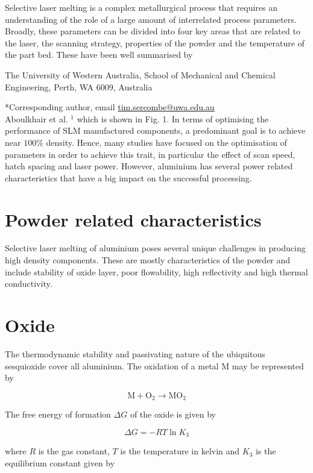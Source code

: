 \documentclass[10pt]{article}
\begin{document}
Selective laser melting is a complex metallurgical process that requires an understanding of the role of a large amount of interrelated process parameters. Broadly, these parameters can be divided into four key areas that are related to the laser, the scanning strategy, properties of the powder and the temperature of the part bed. These have been well summarised by

The University of Western Australia, School of Mechanical and Chemical Engineering, Perth, WA 6009, Australia

*Corresponding author, email \href{mailto:tim.sercombe@uwa.edu.au}{tim.sercombe@uwa.edu.au}\\
Aboulkhair et al. ${ }^{1}$ which is shown in Fig. 1. In terms of optimising the performance of SLM manufactured components, a predominant goal is to achieve near $100 \%$ density. Hence, many studies have focused on the optimisation of parameters in order to achieve this trait, in particular the effect of scan speed, hatch spacing and laser power. However, aluminium has several power related characteristics that have a big impact on the successful processing.

\section*{Powder related characteristics}
Selective laser melting of aluminium poses several unique challenges in producing high density components. These are mostly characteristics of the powder and include stability of oxide layer, poor flowability, high reflectivity and high thermal conductivity.

\section*{Oxide}
The thermodynamic stability and passivating nature of the ubiquitous sesquioxide cover all aluminium. The oxidation of a metal $\mathrm{M}$ may be represented by


\begin{equation*}
\mathrm{M}+\mathrm{O}_{2} \rightarrow \mathrm{MO}_{2} \tag{1}
\end{equation*}


The free energy of formation $\Delta G$ of the oxide is given by


\begin{equation*}
\Delta G=-R T \ln K_{3} \tag{2}
\end{equation*}


where $R$ is the gas constant, $T$ is the temperature in kelvin and $K_{3}$ is the equilibrium constant given by
\end{document}
